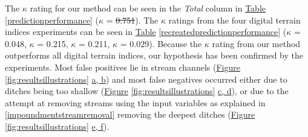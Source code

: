 \documentclass[]{interact}
\theoremstyle{plain}%
\theoremstyle{definition}
\theoremstyle{remark}
\providecommand{\DIFaddtex}[1]{{\protect\color{blue}\uwave{#1}}} %
\providecommand{\DIFdeltex}[1]{{\protect\color{red}\sout{#1}}}                      %
\providecommand{\DIFaddbegin}{} %
\providecommand{\DIFaddend}{} %
\providecommand{\DIFdelbegin}{} %
\providecommand{\DIFdelend}{} %
\providecommand{\DIFadd}[1]{\texorpdfstring{\DIFaddtex{#1}}{#1}} %
\providecommand{\DIFdel}[1]{\texorpdfstring{\DIFdeltex{#1}}{}} %
\begin{document}
The $\kappa$ rating for our method can be seen in the \textit{Total} column in \hyperref[predictionperformance]{Table} \ref{predictionperformance} ($\kappa$ = \DIFdelbegin \DIFdel{0.751}\DIFdelend \DIFaddbegin \DIFadd{0.732}\DIFaddend ). The $\kappa$ ratings from the four digital terrain indices experiments can be seen in  \hyperref[recreatedpredictionperformance]{Table} \ref{recreatedpredictionperformance} ($\kappa$ = 0.048, $\kappa$ = 0.215, $\kappa$ = 0.211, $\kappa$ = 0.029). Because the $\kappa$ rating from our method outperforms all digital terrain indices, our hypothesis has been confirmed by the experiments. Most false positives lie in stream channels (\hyperref[fig:resultsillustrations]{Figure} \ref{fig:resultsillustrations} \hyperref[fig:resultsillustrations]{a, b}) and most false negatives occurred either due to ditches being too shallow (\hyperref[fig:resultsillustrations]{Figure} \ref{fig:resultsillustrations} \hyperref[fig:resultsillustrations]{c, d}), or due to the attempt at removing streams using the input variables as explained in \ref{impoundmentstreamremoval} removing the deepest ditches  (\hyperref[fig:resultsillustrations]{Figure} \ref{fig:resultsillustrations} \hyperref[fig:resultsillustrations]{e, f}).
\end{document}
